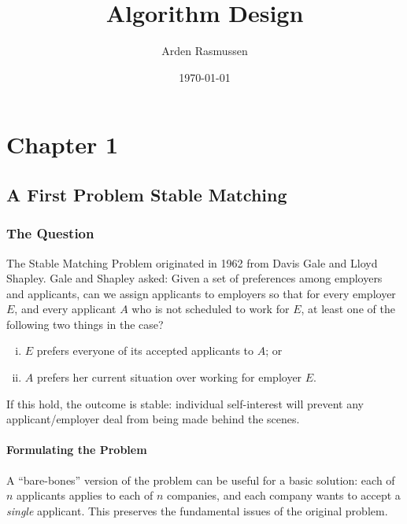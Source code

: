 \documentclass{article}
\title{Algorithm Design}
\author{Arden Rasmussen}
\date{\today}
\begin{document}
\maketitle
\newpage
\pagestyle{toc}
\tableofcontents
\newpage
\pagestyle{doc}

\section{Chapter 1}\label{sec:chapter_1}

\subsection{A First Problem Stable Matching}\label{sub:a_first_problem_stable_matching}

\subsubsection{The Question}\label{ssub:the_question}

The Stable Matching Problem originated in 1962 from Davis Gale and Lloyd
Shapley. Gale and Shapley asked: Given a set of preferences among
employers and applicants, can we assign applicants to employers so that
for every employer \(E\), and every applicant \(A\) who is not scheduled
to work for \(E\), at least one of the following two things in the case?

\begin{enumerate}[(i)]
  \item \(E\) prefers everyone of its accepted applicants to \(A\); or
  \item \(A\) prefers her current situation over working for employer \(E\).
\end{enumerate}

If this hold, the outcome is stable: individual self-interest will
prevent any applicant/employer deal from being made behind the scenes.

\paragraph{Formulating the Problem}\label{par:formulating_the_problem}

A ``bare-bones'' version of the problem can be useful for a basic
solution: each of \(n\) applicants applies to each of \(n\) companies,
and each company wants to accept a \emph{single} applicant. This
preserves the fundamental issues of the original problem.
\end{document}
